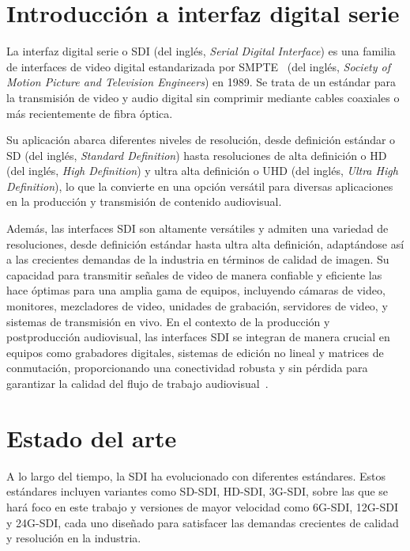 \section{Introducción a interfaz digital serie}

  La interfaz digital serie o SDI (del inglés, \textit{Serial Digital Interface})
  es una familia de interfaces de video digital estandarizada por SMPTE~\citep{smpte}
  (del inglés, \textit{Society of Motion Picture and Television Engineers}) en
  1989. Se trata de un estándar para la transmisión de video y audio digital sin
  comprimir mediante cables coaxiales o más recientemente de fibra óptica.

  Su aplicación abarca diferentes niveles de resolución, desde definición
  estándar o SD (del inglés, \textit{Standard Definition}) hasta resoluciones de
  alta definición o HD (del inglés, \textit{High Definition}) y ultra alta
  definición o UHD (del inglés, \textit{Ultra High Definition}), lo que la convierte
  en una opción versátil para diversas aplicaciones en la producción y transmisión
  de contenido audiovisual.

  Además, las interfaces SDI son altamente versátiles y admiten una variedad de
  resoluciones, desde definición estándar hasta ultra alta definición, adaptándose
  así a las crecientes demandas de la industria en términos de calidad de imagen.
  Su capacidad para transmitir señales de video de manera confiable y eficiente
  las hace óptimas para una amplia gama de equipos, incluyendo cámaras de video,
  monitores, mezcladores de video, unidades de grabación, servidores de video, y
  sistemas de transmisión en vivo. En el contexto de la producción y
  postproducción audiovisual, las interfaces SDI se integran de manera crucial en
  equipos como grabadores digitales, sistemas de edición no lineal y matrices de
  conmutación, proporcionando una conectividad robusta y sin pérdida para
  garantizar la calidad del flujo de trabajo audiovisual~\citep{optcore}.

\section{Estado del arte}

  A lo largo del tiempo, la SDI ha evolucionado con diferentes estándares. Estos
  estándares incluyen variantes como SD-SDI, HD-SDI, 3G-SDI, sobre las que se
  hará foco en este trabajo y versiones de mayor velocidad como 6G-SDI, 12G-SDI
  y 24G-SDI, cada uno diseñado para satisfacer las demandas crecientes de calidad
  y resolución en la industria.

